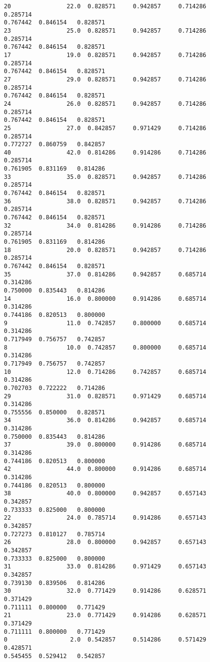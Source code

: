 \documentclass[11pt]{article}
\begin{document}
\begin{tcolorbox}[breakable, size=fbox, boxrule=.5pt, pad at break*=1mm, opacityfill=0]
\begin{Verbatim}[commandchars=\\\{\}]
20                22.0  0.828571     0.942857     0.714286             0.285714
0.767442  0.846154   0.828571
23                25.0  0.828571     0.942857     0.714286             0.285714
0.767442  0.846154   0.828571
17                19.0  0.828571     0.942857     0.714286             0.285714
0.767442  0.846154   0.828571
27                29.0  0.828571     0.942857     0.714286             0.285714
0.767442  0.846154   0.828571
24                26.0  0.828571     0.942857     0.714286             0.285714
0.767442  0.846154   0.828571
25                27.0  0.842857     0.971429     0.714286             0.285714
0.772727  0.860759   0.842857
40                42.0  0.814286     0.914286     0.714286             0.285714
0.761905  0.831169   0.814286
33                35.0  0.828571     0.942857     0.714286             0.285714
0.767442  0.846154   0.828571
36                38.0  0.828571     0.942857     0.714286             0.285714
0.767442  0.846154   0.828571
32                34.0  0.814286     0.914286     0.714286             0.285714
0.761905  0.831169   0.814286
18                20.0  0.828571     0.942857     0.714286             0.285714
0.767442  0.846154   0.828571
35                37.0  0.814286     0.942857     0.685714             0.314286
0.750000  0.835443   0.814286
14                16.0  0.800000     0.914286     0.685714             0.314286
0.744186  0.820513   0.800000
9                 11.0  0.742857     0.800000     0.685714             0.314286
0.717949  0.756757   0.742857
8                 10.0  0.742857     0.800000     0.685714             0.314286
0.717949  0.756757   0.742857
10                12.0  0.714286     0.742857     0.685714             0.314286
0.702703  0.722222   0.714286
29                31.0  0.828571     0.971429     0.685714             0.314286
0.755556  0.850000   0.828571
34                36.0  0.814286     0.942857     0.685714             0.314286
0.750000  0.835443   0.814286
37                39.0  0.800000     0.914286     0.685714             0.314286
0.744186  0.820513   0.800000
42                44.0  0.800000     0.914286     0.685714             0.314286
0.744186  0.820513   0.800000
38                40.0  0.800000     0.942857     0.657143             0.342857
0.733333  0.825000   0.800000
22                24.0  0.785714     0.914286     0.657143             0.342857
0.727273  0.810127   0.785714
26                28.0  0.800000     0.942857     0.657143             0.342857
0.733333  0.825000   0.800000
31                33.0  0.814286     0.971429     0.657143             0.342857
0.739130  0.839506   0.814286
30                32.0  0.771429     0.914286     0.628571             0.371429
0.711111  0.800000   0.771429
21                23.0  0.771429     0.914286     0.628571             0.371429
0.711111  0.800000   0.771429
0                  2.0  0.542857     0.514286     0.571429             0.428571
0.545455  0.529412   0.542857
\end{Verbatim}
\end{tcolorbox}
        
\end{document}
